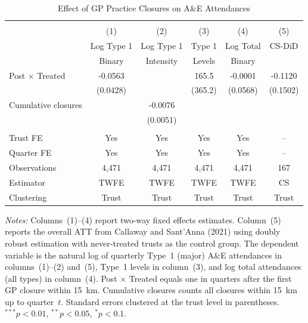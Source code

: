 \begin{table}[t]
\centering
\caption{Effect of GP Practice Closures on A\&E Attendances}
\label{tab:main}
\begin{tabular}{lccccc}
\hline\hline
\\[-1.8ex]
 & (1) & (2) & (3) & (4) & (5) \\
 & Log Type 1 & Log Type 1 & Type 1 & Log Total & CS-DiD \\
 & Binary & Intensity & Levels & Binary & \\
\hline
Post $\times$ Treated & -0.0563 & & 165.5 & -0.0001 & -0.1120 \\
 & (0.0428) & & (365.2) & (0.0568) & (0.1502) \\
Cumulative closures & & -0.0076 & & & \\
 & & (0.0051) & & & \\
\\[-1.0ex]
\hline
Trust FE & Yes & Yes & Yes & Yes & -- \\
Quarter FE & Yes & Yes & Yes & Yes & -- \\
Observations & 4,471 & 4,471 & 4,471 & 4,471 & 167 \\
Estimator & TWFE & TWFE & TWFE & TWFE & CS \\
Clustering & Trust & Trust & Trust & Trust & Trust \\
\hline\hline
\end{tabular}
\begin{tablenotes}
\small
\item \textit{Notes:} Columns~(1)--(4) report two-way fixed effects estimates. Column~(5) reports the overall ATT from Callaway and Sant'Anna (2021) using doubly robust estimation with never-treated trusts as the control group. The dependent variable is the natural log of quarterly Type~1 (major) A\&E attendances in columns~(1)--(2) and~(5), Type~1 levels in column~(3), and log total attendances (all types) in column~(4). Post $\times$ Treated equals one in quarters after the first GP closure within 15~km. Cumulative closures counts all closures within 15~km up to quarter~$t$. Standard errors clustered at the trust level in parentheses. $^{***}p<0.01$, $^{**}p<0.05$, $^{*}p<0.1$.
\end{tablenotes}
\end{table}
